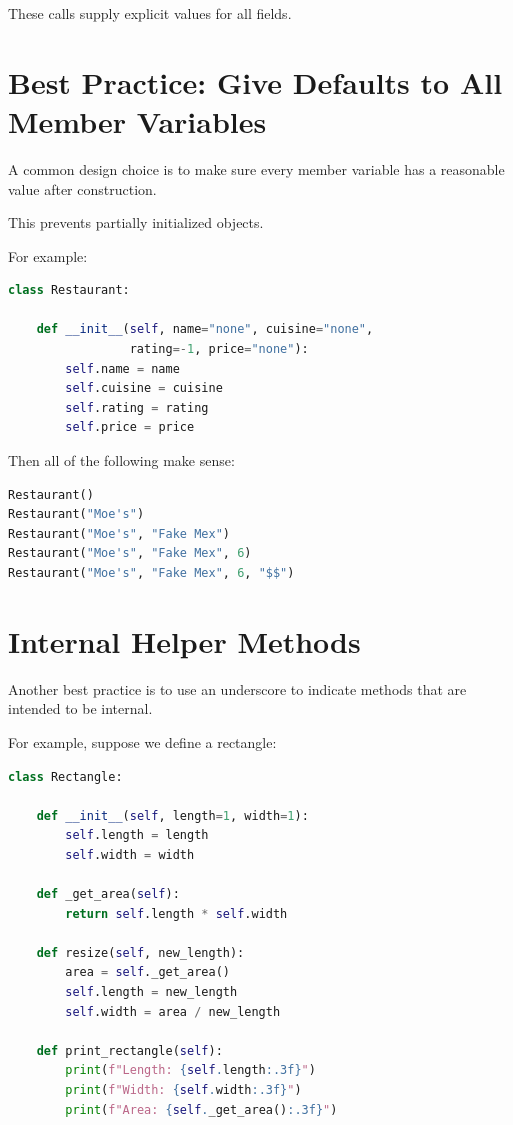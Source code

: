 \documentclass[11pt]{article}
\begin{document}
These calls supply explicit values for all fields.

\section{Best Practice: Give Defaults to All Member Variables}

A common design choice is to make sure every member variable has a reasonable value after construction.

This prevents partially initialized objects.

For example:

\begin{lstlisting}[language=Python]
class Restaurant:

    def __init__(self, name="none", cuisine="none",
                 rating=-1, price="none"):
        self.name = name
        self.cuisine = cuisine
        self.rating = rating
        self.price = price
\end{lstlisting}

Then all of the following make sense:

\begin{lstlisting}[language=Python]
Restaurant()
Restaurant("Moe's")
Restaurant("Moe's", "Fake Mex")
Restaurant("Moe's", "Fake Mex", 6)
Restaurant("Moe's", "Fake Mex", 6, "$$")
\end{lstlisting}

\section{Internal Helper Methods}

Another best practice is to use an underscore to indicate methods that are intended to be internal.

For example, suppose we define a rectangle:

\begin{lstlisting}[language=Python]
class Rectangle:

    def __init__(self, length=1, width=1):
        self.length = length
        self.width = width

    def _get_area(self):
        return self.length * self.width

    def resize(self, new_length):
        area = self._get_area()
        self.length = new_length
        self.width = area / new_length

    def print_rectangle(self):
        print(f"Length: {self.length:.3f}")
        print(f"Width: {self.width:.3f}")
        print(f"Area: {self._get_area():.3f}")
\end{lstlisting}
\end{document}
